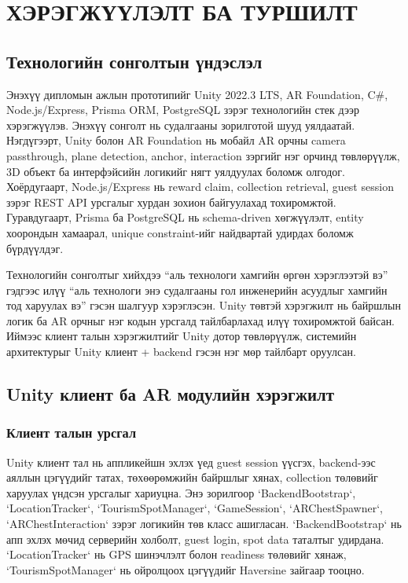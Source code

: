 \chapter{ХЭРЭГЖҮҮЛЭЛТ БА ТУРШИЛТ}
\begin{sloppy}

\section{Технологийн сонголтын үндэслэл}

Энэхүү дипломын ажлын прототипийг Unity 2022.3 LTS, AR Foundation, C\#, Node.js/Express, Prisma ORM, PostgreSQL зэрэг технологийн стек дээр хэрэгжүүлэв. Энэхүү сонголт нь судалгааны зорилготой шууд уялдаатай. Нэгдүгээрт, Unity болон AR Foundation нь мобайл AR орчны camera passthrough, plane detection, anchor, interaction зэргийг нэг орчинд төвлөрүүлж, 3D объект ба интерфэйсийн логикийг нягт уялдуулах боломж олгодог. Хоёрдугаарт, Node.js/Express нь reward claim, collection retrieval, guest session зэрэг REST API урсгалыг хурдан зохион байгуулахад тохиромжтой. Гуравдугаарт, Prisma ба PostgreSQL нь schema-driven хөгжүүлэлт, entity хоорондын хамаарал, unique constraint-ийг найдвартай удирдах боломж бүрдүүлдэг.

Технологийн сонголтыг хийхдээ ``аль технологи хамгийн өргөн хэрэглээтэй вэ'' гэдгээс илүү ``аль технологи энэ судалгааны гол инженерийн асуудлыг хамгийн тод харуулах вэ'' гэсэн шалгуур хэрэглэсэн. Unity төвтэй хэрэгжилт нь байршлын логик ба AR орчныг нэг кодын урсгалд тайлбарлахад илүү тохиромжтой байсан. Иймээс клиент талын хэрэгжилтийг Unity дотор төвлөрүүлж, системийн архитектурыг Unity клиент + backend гэсэн нэг мөр тайлбарт оруулсан.

\section{Unity клиент ба AR модулийн хэрэгжилт}

\subsection{Клиент талын урсгал}

Unity клиент тал нь аппликейшн эхлэх үед guest session үүсгэх, backend-ээс аяллын цэгүүдийг татах, төхөөрөмжийн байршлыг хянах, collection төлөвийг харуулах үндсэн урсгалыг хариуцна. Энэ зорилгоор `BackendBootstrap`, `LocationTracker`, `TourismSpotManager`, `GameSession`, `ARChestSpawner`, `ARChestInteraction` зэрэг логикийн төв класс ашигласан. `BackendBootstrap` нь апп эхлэх мөчид серверийн холболт, guest login, spot data таталтыг удирдана. `LocationTracker` нь GPS шинэчлэлт болон readiness төлөвийг хянаж, `TourismSpotManager` нь ойролцоох цэгүүдийг Haversine зайгаар тооцно.


\end{sloppy}

